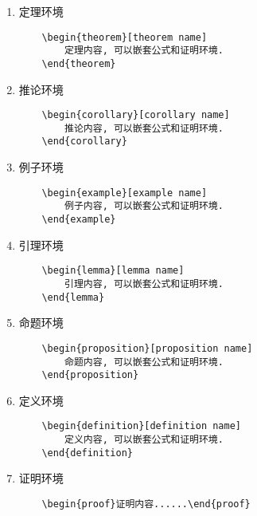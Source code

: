 \begin{tcolorbox}[colback=gray!10,
    colframe=black,
    width=16cm,
    arc=1mm, auto outer arc,
    boxrule=0.5pt,]

    \begin{enumerate}[itemsep= 10pt, partopsep=10pt]
        \item 定理环境
\begin{verbatim}
    \begin{theorem}[theorem name]
        定理内容, 可以嵌套公式和证明环境.
    \end{theorem}
\end{verbatim}
        \item 推论环境
\begin{verbatim}
    \begin{corollary}[corollary name]
        推论内容, 可以嵌套公式和证明环境.
    \end{corollary}
\end{verbatim}
        \item 例子环境
\begin{verbatim}
    \begin{example}[example name]
        例子内容, 可以嵌套公式和证明环境.
    \end{example}
\end{verbatim}
        \item 引理环境
\begin{verbatim}
    \begin{lemma}[lemma name]
        引理内容, 可以嵌套公式和证明环境.
    \end{lemma}
\end{verbatim}
        \item 命题环境
\begin{verbatim}
    \begin{proposition}[proposition name]
        命题内容, 可以嵌套公式和证明环境.
    \end{proposition}
\end{verbatim}
        \item 定义环境
\begin{verbatim}
    \begin{definition}[definition name]
        定义内容, 可以嵌套公式和证明环境.
    \end{definition}
\end{verbatim}
        \item 证明环境
\begin{verbatim}
    \begin{proof}证明内容......\end{proof}
\end{verbatim}
    \end{enumerate}
\end{tcolorbox}

